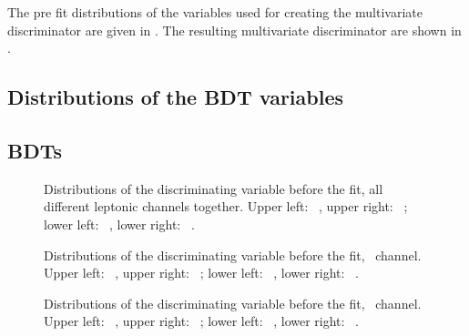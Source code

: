 The pre fit distributions of the variables used for creating the multivariate discriminator are given in . The resulting multivariate discriminator are shown in . 

\subsection{Distributions of the BDT variables}
\label{sec:BDTvars}


\subsection{BDTs}
\label{sec:BDTs}
\begin{figure}[htbp]
	\centering
	\caption{Distributions of the discriminating variable before the fit, all different leptonic channels together. Upper left: \TTSR\ \Zut , upper right: \TTSR\ \Zct ; lower left: \STSR\  \Zut , lower right: \STSR\  \Zct .}
	\label{fig:bdtallstack}
\end{figure}	

\begin{figure}[ht]
	\centering
	\caption{Distributions of the discriminating variable before the fit, \mumumu\  channel. Upper left: \TTSR\ \Zut , upper right: \TTSR\ \Zct ; lower left: \STSR\  \Zut , lower right: \STSR\  \Zct .}
	\label{fig:bdtuuustack}
\end{figure}


\begin{figure}[ht]
	\centering
	\caption{Distributions of the discriminating variable before the fit, \emumu\  channel. Upper left: \TTSR\ \Zut , upper right: \TTSR\ \Zct ; lower left: \STSR\  \Zut , lower right: \STSR\  \Zct .}
	\label{fig:bdtuuestack}
\end{figure}

